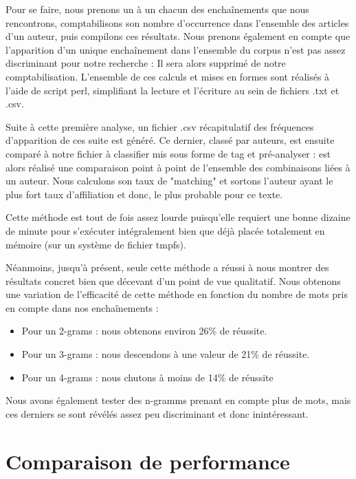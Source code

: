 \documentclass[a4paper,12pt]{report}
\begin{document}
Pour se faire, nous prenons un à un chacun des enchaînements que nous rencontrons, comptabilisons son nombre d'occurrence dans l'ensemble des articles d'un auteur, puis compilons ces résultats. Nous prenons également en compte que l'apparition d'un unique enchaînement dans l'ensemble du corpus n'est pas assez discriminant pour notre recherche : Il sera alors supprimé de notre comptabilisation. L'ensemble de ces calculs et mises en formes sont réalisés à l'aide de script perl, simplifiant la lecture et l'écriture au sein de fichiers .txt et .csv.

Suite à cette première analyse, un fichier .csv récapitulatif des fréquences d'apparition de ces suite est généré. Ce dernier, classé par auteurs, est ensuite comparé à notre fichier à classifier mis sous forme de tag et pré-analyser : est alors réalisé une comparaison point à point de l'ensemble des combinaisons liées à un auteur. Nous calculons son taux de "matching" et sortons l'auteur ayant le plus fort taux d'affiliation et donc, le plus probable pour ce texte. 

Cette méthode est tout de fois assez lourde puisqu'elle requiert une bonne dizaine de minute pour s'exécuter intégralement bien que déjà placée totalement en mémoire (sur un système de fichier tmpfs). 

Néanmoins, jusqu'à présent, seule cette méthode a réussi à nous montrer des résultats concret bien que décevant d'un point de vue qualitatif. Nous obtenons une variation de l'efficacité de cette méthode en fonction du nombre de mots pris en compte dans nos enchaînements :

\begin{itemize}
\item{Pour un 2-grams : nous obtenons environ 26\% de réussite.}
\item{Pour un 3-grams : nous descendons à une valeur de 21\% de réussite.}
\item{Pour un 4-grams : nous chutons à moins de 14\% de réussite}
\end{itemize}

Nous avons également tester des n-gramms prenant en compte plus de mots, mais ces derniers se sont révélés assez peu discriminant et donc inintéressant.



\section{Comparaison de performance}
\end{document}
